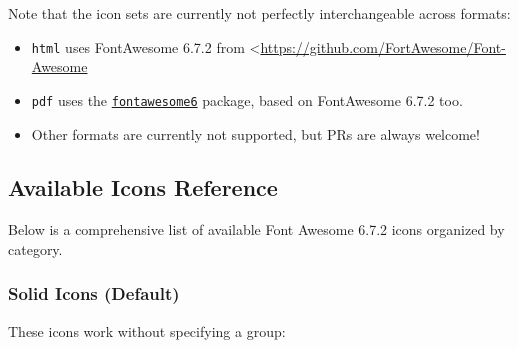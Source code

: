 \documentclass[
  letterpaper,
  DIV=11,
  numbers=noendperiod]{scrartcl}
\providecommand{\tightlist}{%
  \setlength{\itemsep}{0pt}\setlength{\parskip}{0pt}}
\begin{document}
Note that the icon sets are currently not perfectly interchangeable
across formats:

\begin{itemize}
\tightlist
\item
  \texttt{html} uses FontAwesome 6.7.2 from
  \textless{}\url{https://github.com/FortAwesome/Font-Awesome}
\item
  \texttt{pdf} uses the
  \href{https://ctan.org/pkg/fontawesome6}{\texttt{fontawesome6}}
  package, based on FontAwesome 6.7.2 too.
\item
  Other formats are currently not supported, but PRs are always welcome!
\end{itemize}

\subsection{Available Icons Reference}\label{available-icons-reference}

Below is a comprehensive list of available Font Awesome 6.7.2 icons
organized by category.

\subsubsection{Solid Icons (Default)}\label{solid-icons-default}

These icons work without specifying a group:
\end{document}
